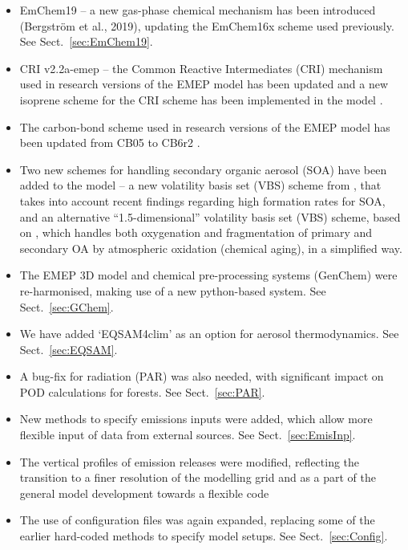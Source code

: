 \begin{itemize}

\item
EmChem19 -- a new gas-phase chemical mechanism has been
introduced (Bergstr{\"o}m et al., 2019), updating the EmChem16x scheme used previously. See
Sect.~\ref{sec:EmChem19}.

\item
CRI v2.2a-emep -- the Common Reactive Intermediates (CRI) mechanism \citep{Jenkin2008}
used
in research versions of the EMEP model has been updated and a new isoprene scheme for the
CRI scheme has been implemented in the model \citep{JenkinCRI2019,McFiggans:2019}.

\item
The carbon-bond scheme used in research versions of the EMEP model has been updated from
CB05 \citep{Yarwood_et_al:2005} to CB6r2
\citep[]{LueckenAE2019}.

\item
Two new schemes for handling secondary organic aerosol (SOA) have been
added to the model -- a new volatility basis set (VBS) scheme from
\citet{Hodzic2016}, that takes into account recent findings regarding
high formation rates for SOA, and an alternative ``1.5-dimensional''
volatility basis set (VBS) scheme, based on \citet{Koo2014}, which
handles both oxygenation and fragmentation of primary and secondary OA
by atmospheric oxidation (chemical aging), in a simplified way.

\item
The EMEP 3D model and chemical pre-processing systems (GenChem)
were re-harmonised, making use of a new python-based system. See
Sect.~\ref{sec:GChem}.

\item
We have added `EQSAM4clim' as an option for aerosol thermodynamics. See
Sect.~\ref{sec:EQSAM}.

\item
A bug-fix for radiation (PAR) was also needed, with significant impact
on POD calculations for forests. See Sect.~\ref{sec:PAR}.

\item
New methods to specify emissions inputs were added, which allow more
flexible input of data from external sources. See Sect.~\ref{sec:EmisInp}.

\item
The vertical profiles of emission releases were modified, reflecting
the transition to a finer resolution of the modelling grid and as a
part of the general model development towards a flexible code

\item
The use of configuration files was again expanded, replacing some
of the earlier hard-coded methods to specify model setups. See
Sect.~\ref{sec:Config}.


\end{itemize}



